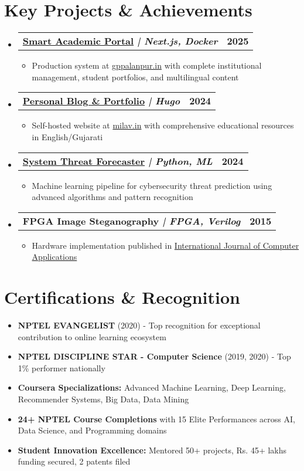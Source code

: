 \documentclass[11pt,a4paper]{article}
\makeatletter
\newcommand{\resumeItem}[1]{
    \item\footnotesize{#1 \vspace{-1pt}}
}
\newcommand{\resumeProjectHeading}[2]{
    \vspace{-1pt}\item
    \begin{tabular*}{0.97\textwidth}{l@{\extracolsep{\fill}}r}
        \footnotesize\textbf{\color{secondary}#1} & \textbf{\color{mediumgray}\footnotesize #2} \\
    \end{tabular*}\vspace{-2pt}
}
\newcommand{\resumeSubHeadingListStart}{\begin{itemize}[leftmargin=0.15in, label={}]}
\newcommand{\resumeSubHeadingListEnd}{\end{itemize}}
\newcommand{\resumeItemListStart}{\begin{itemize}[leftmargin=0.25in]}
\newcommand{\resumeItemListEnd}{\end{itemize}\vspace{-3pt}}
\makeatother
\begin{document}
\vspace{-4pt}

\section{Key Projects \& Achievements}
\resumeSubHeadingListStart

\resumeProjectHeading
{\textbf{\href{https://github.com/milavdabgar/studio}{Smart Academic Portal}} \textit{| Next.js, Docker}}{2025}
\resumeItemListStart
\resumeItem{Production system at \href{https://gppalanpur.in/}{gppalanpur.in} with complete institutional management, student portfolios, and multilingual content}
\resumeItemListEnd

\resumeProjectHeading
{\textbf{\href{https://github.com/milavdabgar/milav-blowfish}{Personal Blog \& Portfolio}} \textit{| Hugo}}{2024}
\resumeItemListStart
\resumeItem{Self-hosted website at \href{https://milav.in/}{milav.in} with comprehensive educational resources in English/Gujarati}
\resumeItemListEnd

\resumeProjectHeading
{\textbf{\href{https://github.com/milavdabgar/MLP-Project}{System Threat Forecaster}} \textit{| Python, ML}}{2024}
\resumeItemListStart
\resumeItem{Machine learning pipeline for cybersecurity threat prediction using advanced algorithms and pattern recognition}
\resumeItemListEnd

\resumeProjectHeading
{\textbf{FPGA Image Steganography} \textit{| FPGA, Verilog}}{2015}
\resumeItemListStart
\resumeItem{Hardware implementation published in \href{https://www.ijcaonline.org/archives/volume120/number9/21259-4125}{\color{primary}International Journal of Computer Applications}}
\resumeItemListEnd

\resumeSubHeadingListEnd

\vspace{-2pt}

\section{Certifications \& Recognition}
\footnotesize
\begin{itemize}[leftmargin=0.15in, label={}, itemsep=1pt]
    \item \textbf{NPTEL EVANGELIST} (2020) - Top recognition for exceptional contribution to online learning ecosystem
    \item \textbf{NPTEL DISCIPLINE STAR - Computer Science} (2019, 2020) - Top 1\% performer nationally  
    \item \textbf{Coursera Specializations:} Advanced Machine Learning, Deep Learning, Recommender Systems, Big Data, Data Mining
    \item \textbf{24+ NPTEL Course Completions} with 15 Elite Performances across AI, Data Science, and Programming domains
    \item \textbf{Student Innovation Excellence:} Mentored 50+ projects, Rs. 45+ lakhs funding secured, 2 patents filed
\end{itemize}
\end{document}
